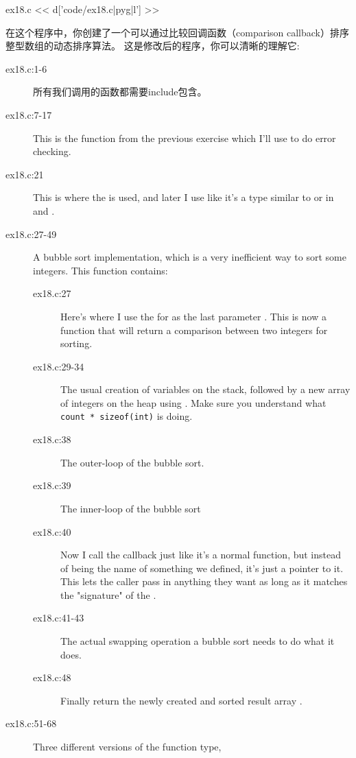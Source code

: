 \begin{code}{ex18.c}
<< d['code/ex18.c|pyg|l'] >>
\end{code}

在这个程序中，你创建了一个可以通过比较回调函数（comparison callback）排序整型数组的动态排序算法。 这是修改后的程序，你可以清晰的理解它:

\begin{description}
\item[ex18.c:1-6] 所有我们调用的函数都需要include包含。
\item[ex18.c:7-17] This is the  function from the previous exercise
    which I'll use to do error checking.
\item[ex18.c:21] This is where the  is used, and later I use 
     like it's a type similar to  or 
     in  and .
\item[ex18.c:27-49] A bubble sort implementation, which is a very inefficient way
    to sort some integers.  This function contains:
    \begin{description}
    \item[ex18.c:27] Here's where I use the  for 
        as the last parameter .  This is now a function that will
        return a comparison between two integers for sorting.
    \item[ex18.c:29-34] The usual creation of variables on the stack, followed by
    a new array of integers on the heap using .  Make sure you
    understand what \verb|count * sizeof(int)| is doing.
    \item[ex18.c:38] The outer-loop of the bubble sort.
    \item[ex18.c:39] The inner-loop of the bubble sort
    \item[ex18.c:40] Now I call the  callback just like it's a normal
        function, but instead of being the name of something we defined, 
        it's just a pointer to it.  This lets the caller pass in anything
        they want as long as it matches the "signature" of the 
        .
    \item[ex18.c:41-43] The actual swapping operation a bubble sort needs to do what it
        does.
    \item[ex18.c:48] Finally return the newly created and sorted result array .
    \end{description}
\item[ex18.c:51-68] Three different versions of the  function type,

\end{description}

